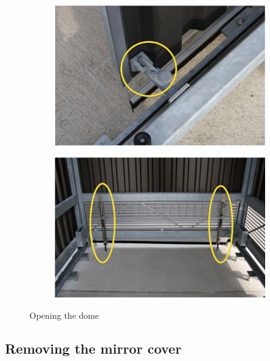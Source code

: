 \documentclass[a4paper, 11pt, fleqn]{memoir}
\begin{document}
\begin{figure}
    \centering
    \begin{subfigure}[c]{0.47\textwidth}
        \includegraphics[width=\textwidth]{door_secure-locks}
        \label{fig:door-locks}
    \end{subfigure}
    \begin{subfigure}[c]{0.47\textwidth}
        \includegraphics[width=\textwidth]{dome_secure-locks}
        \label{fig:dome-locks}
    \end{subfigure}
    \caption{Opening the dome}
\end{figure}

\subsection{Removing the mirror cover}
\label{sec:mirror-cover}
\end{document}
